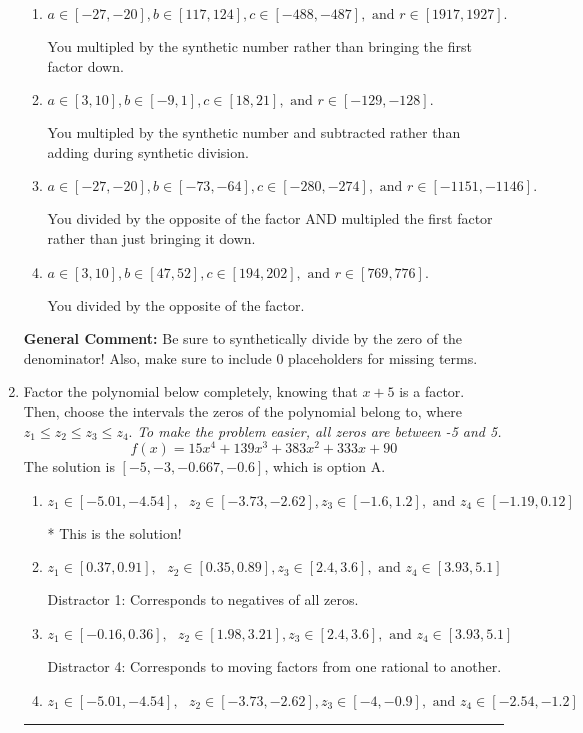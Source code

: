 \documentclass{extbook}[14pt]
\newcommand{\litem}[1]{\item #1

\rule{\textwidth}{0.4pt}}
\begin{document}
\begin{enumerate}
{\begin{enumerate}[label=\Alph*.]
* This is the solution!
\item \( a \in [-27, -20], b \in [117, 124], c \in [-488, -487], \text{ and } r \in [1917, 1927]. \)

 You multipled by the synthetic number rather than bringing the first factor down.
\item \( a \in [3, 10], b \in [-9, 1], c \in [18, 21], \text{ and } r \in [-129, -128]. \)

 You multipled by the synthetic number and subtracted rather than adding during synthetic division.
\item \( a \in [-27, -20], b \in [-73, -64], c \in [-280, -274], \text{ and } r \in [-1151, -1146]. \)

 You divided by the opposite of the factor AND multipled the first factor rather than just bringing it down.
\item \( a \in [3, 10], b \in [47, 52], c \in [194, 202], \text{ and } r \in [769, 776]. \)

 You divided by the opposite of the factor.
\end{enumerate}

\textbf{General Comment:} Be sure to synthetically divide by the zero of the denominator! Also, make sure to include 0 placeholders for missing terms.
}
\litem{
Factor the polynomial below completely, knowing that $x + 5$ is a factor. Then, choose the intervals the zeros of the polynomial belong to, where $z_1 \leq z_2 \leq z_3 \leq z_4$. \textit{To make the problem easier, all zeros are between -5 and 5.}
\[ f(x) = 15x^{4} +139 x^{3} +383 x^{2} +333 x + 90 \]The solution is \( [-5, -3, -0.667, -0.6] \), which is option A.\begin{enumerate}[label=\Alph*.]
\item \( z_1 \in [-5.01, -4.54], \text{   }  z_2 \in [-3.73, -2.62], z_3 \in [-1.6, 1.2], \text{   and   } z_4 \in [-1.19, 0.12] \)

* This is the solution!
\item \( z_1 \in [0.37, 0.91], \text{   }  z_2 \in [0.35, 0.89], z_3 \in [2.4, 3.6], \text{   and   } z_4 \in [3.93, 5.1] \)

 Distractor 1: Corresponds to negatives of all zeros.
\item \( z_1 \in [-0.16, 0.36], \text{   }  z_2 \in [1.98, 3.21], z_3 \in [2.4, 3.6], \text{   and   } z_4 \in [3.93, 5.1] \)

 Distractor 4: Corresponds to moving factors from one rational to another.
\item \( z_1 \in [-5.01, -4.54], \text{   }  z_2 \in [-3.73, -2.62], z_3 \in [-4, -0.9], \text{   and   } z_4 \in [-2.54, -1.2] \)


\end{enumerate}}
\end{enumerate}
\end{document}
